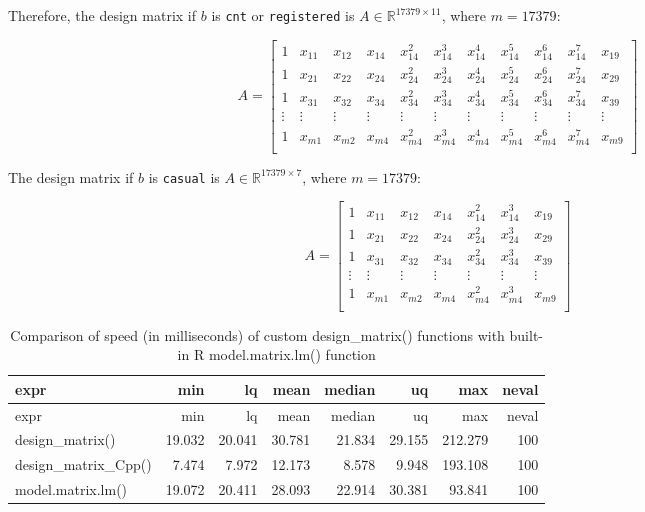 \documentclass[
]{article}
\begin{document}
Therefore, the design matrix if \(b\) is \texttt{cnt} or
\texttt{registered} is \(A \in \mathbb{R}^{17379 \times 11}\), where
\(m = 17379\):

\[
A=
  \begin{bmatrix}
    1 & x_{11} & x_{12} & x_{14} & x_{14}^{2} & x_{14}^{3} & x_{14}^{4} & x_{14}^{5} & x_{14}^{6} & x_{14}^{7} & x_{19} \\
    1 & x_{21} & x_{22} & x_{24} & x_{24}^{2} & x_{24}^{3} & x_{24}^{4} & x_{24}^{5} & x_{24}^{6} & x_{24}^{7} & x_{29} \\
    1 & x_{31} & x_{32} & x_{34} & x_{34}^{2} & x_{34}^{3} & x_{34}^{4} & x_{34}^{5} & x_{34}^{6} & x_{34}^{7} & x_{39} \\
    \vdots & \vdots & \vdots & \vdots & \vdots & \vdots & \vdots & \vdots & \vdots & \vdots & \vdots \\
    1 & x_{m1} & x_{m2} & x_{m4} & x_{m4}^{2} & x_{m4}^{3} & x_{m4}^{4} & x_{m4}^{5} & x_{m4}^{6} & x_{m4}^{7} & x_{m9} \\
  \end{bmatrix} 
\]

The design matrix if \(b\) is \texttt{casual} is
\(A \in \mathbb{R}^{17379 \times 7}\), where \(m = 17379\):

\[
A=
  \begin{bmatrix}
    1 & x_{11} & x_{12} & x_{14} & x_{14}^{2} & x_{14}^{3} & x_{19} \\
    1 & x_{21} & x_{22} & x_{24} & x_{24}^{2} & x_{24}^{3} & x_{29} \\
    1 & x_{31} & x_{32} & x_{34} & x_{34}^{2} & x_{34}^{3} & x_{39} \\
    \vdots & \vdots & \vdots & \vdots & \vdots & \vdots & \vdots  \\
    1 & x_{m1} & x_{m2} & x_{m4} & x_{m4}^{2} & x_{m4}^{3} & x_{m9} \\
  \end{bmatrix} 
\]

\begin{longtable}[]{@{}lrrrrrrr@{}}
\caption{Comparison of speed (in milliseconds) of custom
design\_matrix() functions with built-in R model.matrix.lm()
function}\tabularnewline
\toprule
expr & min & lq & mean & median & uq & max & neval\tabularnewline
\midrule
\endfirsthead
\toprule
expr & min & lq & mean & median & uq & max & neval\tabularnewline
\midrule
\endhead
design\_matrix() & 19.032 & 20.041 & 30.781 & 21.834 & 29.155 & 212.279
& 100\tabularnewline
design\_matrix\_Cpp() & 7.474 & 7.972 & 12.173 & 8.578 & 9.948 & 193.108
& 100\tabularnewline
model.matrix.lm() & 19.072 & 20.411 & 28.093 & 22.914 & 30.381 & 93.841
& 100\tabularnewline
\bottomrule
\end{longtable}
\end{document}
